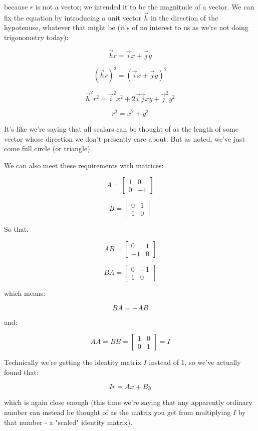 because $r$ is not a vector; we intended it to be the magnitude of a vector. We can fix the equation by introducing a unit vector $\vec{h}$ in the direction of the hypotenuse, whatever that might be (it's of no interest to us as we're not doing trigonometry today):

$$\vec{h}r = \vec{i}x + \vec{j}y$$

$$(\vec{h}r)^2 = (\vec{i}x + \vec{j}y)^2$$

$$\vec{h}^2 r^2 = \vec{i}^2x^2 + 2\vec{i}\vec{j}xy + \vec{j}^2y^2$$

$$r^2 = x^2 + y^2$$

It's like we're saying that all scalars can be thought of as the length of some vector whose direction we don't presently care about. But as noted, we've just come full circle (or triangle).

We can also meet these requirements with matrices:

$$A = \begin{bmatrix}1 & 0 \\ 0 & -1\end{bmatrix}$$

$$
B = \begin{bmatrix}0 & 1 \\ 1 & 0\end{bmatrix}
$$

So that:

$$AB = \begin{bmatrix}0 & 1 \\ -1 & 0\end{bmatrix}$$

$$BA = \begin{bmatrix}0 & -1 \\ 1 & 0\end{bmatrix}$$

which means:

$$BA = -AB$$

and:

$$AA = BB = \begin{bmatrix}1 & 0 \\ 0 & 1\end{bmatrix} = I$$

Technically we're getting the identity matrix $I$ instead of 1, so we've actually found that:

$$Ir = Ax + By$$

which is again close enough (this time we're saying that any apparently ordinary number can instead be thought of as the matrix you get from multiplying $I$ by that number - a "scaled" identity matrix).

